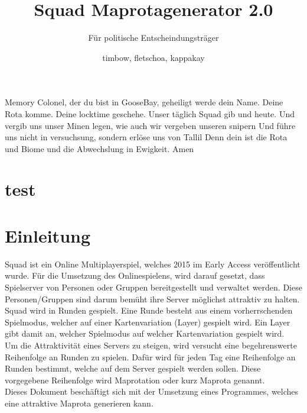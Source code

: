 \documentclass[a4paper, 11pt]{scrartcl}
\title{Squad Maprotagenerator 2.0}
\subtitle{Für politische Entscheindungsträger}
\author{timbow, fletschoa, kappakay}
\begin{document}
    
    \maketitle
    
    \tableofcontents
    \newpage

    Memory Colonel, der du bist in GooseBay, geheiligt werde dein Name.
    Deine Rota komme.
    Deine locktime geschehe.
    Unser täglich Squad gib und heute. Und vergib uns unser Minen legen, wie auch wir vergeben unseren snipern
    Und führe uns nicht in versuchsung, sondern erlöse uns von Tallil
    Denn dein ist die Rota und Biome und die Abwechslung in Ewigkeit.
    Amen

    \newpage
    \listoffigures
    \label{sec:abkuerzungverzeichnis}
    \newpage


    \section{test}
    \section{Einleitung}
        Squad ist ein Online Multiplayerspiel, welches 2015 im \glqq{}Early Access\grqq{} veröffentlicht wurde.\cite{steampage}
        Für die Umsetzung des Onlinespielens, wird darauf gesetzt, 
        dass Spielserver von Personen oder Gruppen bereitgestellt und verwaltet werden.
        \cite{wiki.serverbrowser}
        Diese Personen/Gruppen sind darum bemüht ihre Server möglichst attraktiv zu halten. \\
        Squad wird in Runden gespielt. Eine Runde besteht aus einem vorherrschenden Spielmodus, 
        welcher auf einer Kartenvariation (Layer) gespielt wird. 
        Ein Layer gibt damit an, welcher Spielmodus auf welcher Kartenvariation gespielt wird.\\ 
        Um die Attraktivität eines Servers zu steigen, wird versucht eine begehrenswerte Reihenfolge an Runden zu spielen.
        Dafür wird für jeden Tag eine Reihenfolge an Runden bestimmt, welche auf dem Server gespielt werden sollen.
        Diese vorgegebene Reihenfolge wird Maprotation oder kurz Maprota genannt.\\
        Dieses Dokument beschäftigt sich mit der Umsetzung eines Programmes, welches eine attraktive Maprota generieren kann.   
\end{document}
